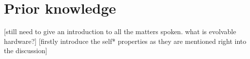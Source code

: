 
\section{Prior knowledge}

[still need to give an introduction to all the matters spoken. what is evolvable hardware?]
[firstly introduce the self* properties as they are mentioned right into the discussion]
